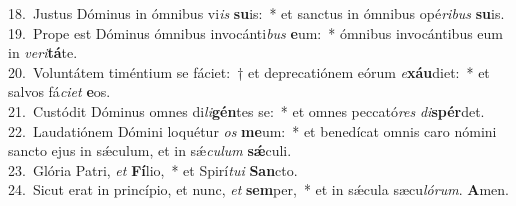 {18.~}Justus Dóminus in ómnibus vi\textit{is} \textbf{su}is:~* et sanctus in ómnibus opé\textit{ri}\textit{bus} \textbf{su}is.\\
{19.~}Prope est Dóminus ómnibus invocánti\textit{bus} \textbf{e}um:~* ómnibus invocántibus eum in \textit{ve}\textit{ri}\textbf{tá}te.\\
{20.~}Voluntátem timéntium se fáciet:~† et deprecatiónem eórum \textit{e}\textbf{xáu}diet:~* et salvos fá\textit{ci}\textit{et} \textbf{e}os.\\
{21.~}Custódit Dóminus omnes di\textit{li}\textbf{gén}tes se:~* et omnes peccató\textit{res} \textit{di}\textbf{spér}det.\\
{22.~}Laudatiónem Dómini loquétur \textit{os} \textbf{me}um:~* et benedícat omnis caro nómini sancto ejus in sǽculum, et in sǽ\textit{cu}\textit{lum} \textbf{sǽ}culi.\\
{23.~}Glória Patri, \textit{et} \textbf{Fí}lio,~* et Spirí\textit{tu}\textit{i} \textbf{San}cto.\\
{24.~}Sicut erat in princípio, et nunc, \textit{et} \textbf{sem}per,~* et in sǽcula sæcu\textit{ló}\textit{rum}. \textbf{A}men.\\

